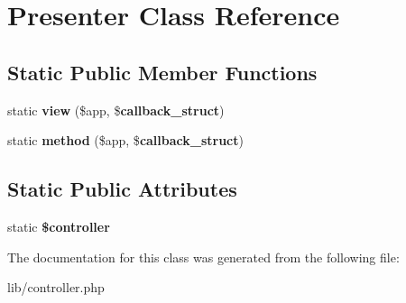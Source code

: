 \section{Presenter Class Reference}
\label{class_presenter}
\subsection*{Static Public Member Functions}
\begin{DoxyCompactItemize}
\item 
static {\bfseries view} (\$app, \${\bf callback\_\-struct})\label{class_presenter_a799b58af240235606b30c6f4c5fcdd86}

\item 
static {\bfseries method} (\$app, \${\bf callback\_\-struct})\label{class_presenter_a25ebadaebac70aa5080d59c030d1fe95}

\end{DoxyCompactItemize}
\subsection*{Static Public Attributes}
\begin{DoxyCompactItemize}
\item 
static {\bfseries \$controller}\label{class_presenter_a388ef7b1db5e6f728e63cee704ce6e23}

\end{DoxyCompactItemize}


The documentation for this class was generated from the following file:\begin{DoxyCompactItemize}
\item 
lib/controller.php\end{DoxyCompactItemize}
